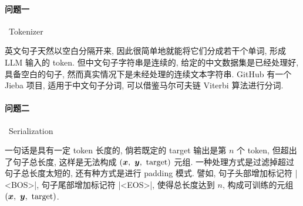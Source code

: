\documentclass[draft]{article}
\begin{document}
\paragraph*{问题一}~{Tokenizer}

英文句子天然以空白分隔开来, 因此很简单地就能将它们分成若干个单词, 形成 LLM 输入的 token. 但中文句子字符串是连续的, 给定的中文数据集是已经处理好, 具备空白的句子, 然而真实情况下是未经处理的连续文本字符串. GitHub 有一个 Jieba 项目, 适用于中文句子分词, 可以借鉴马尔可夫链 Viterbi 算法进行分词.

\paragraph*{问题二}~{Serialization}

一句话是具有一定 token 长度的, 倘若既定的 target 输出是第 $n$ 个 token, 但超出了句子总长度, 这样是无法构成 $(\bm{x},\ \bm{y},\ {\rm target})$ 元组. 一种处理方式是过滤掉超过句子总长度太短的, 还有种方式是进行 padding 模式. 譬如, 句子头部增加标记符 |<BOS>|, 句子尾部增加标记符 |<EOS>|, 使得总长度达到 $n$, 构成可训练的元组 $(\bm{x},\ \bm{y},\ {\rm target})$.
\end{document}
